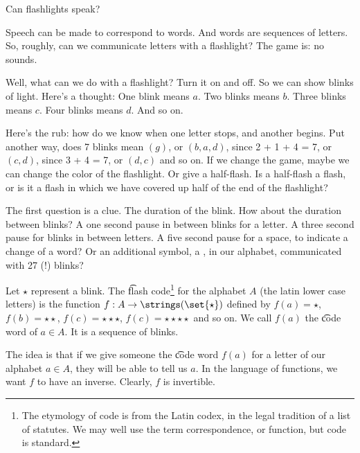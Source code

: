 

Can flashlights speak?

Speech can be made to correspond to words.
And words are sequences of letters.
So, roughly, can we communicate letters with a flashlight?
The game is: no sounds.


Well, what can we do with a flashlight?
Turn it on and off.
So we can show blinks of light.
Here's a thought:
One blink means $a$.
Two blinks means $b$.
Three blinks means $c$.
Four blinks means $d$.
And so on.

Here's the rub: how do we know when one letter stops, and another begins.
Put another way, does 7 blinks mean $(g)$, or $(b, a, d)$, since 2 + 1 + 4 = 7, or $(c, d)$, since 3 + 4 = 7, or $(d, c)$ and so on.
If we change the game, maybe we can change the color of the flashlight.
Or give a half-flash.
Is a half-flash a  flash, or is it a flash in which we have covered up half of the end of the flashlight?

The first question is a clue.
The duration of the blink.
How about the duration between blinks?
A one second pause in between blinks for a letter.
A three second pause for blinks in between letters.
A five second pause for a space, to indicate a change of a word?
Or an additional symbol, a , in our alphabet, communicated with 27 (!) blinks?



\newcommand{\blink}{\star}
\newcommand{\pause}{\square}
Let $\blink$ represent a blink.
The \t{flash code}\footnote{The etymology of code is from the Latin codex, in the legal tradition of a list of statutes. We may well use the term correspondence, or function, but code is standard.} for the alphabet $A$ (the latin lower case letters) is the function $f: A \to \strings(\set{\blink})$ defined by $f(a) = \blink$, $f(b) = \blink\blink$, $f(c) = \blink\blink\blink$, $f(c) = \blink\blink\blink\blink$ and so on.
We call $f(a)$ the \t{code word} of $a \in A$.
It is a sequence of blinks.

The idea is that if we give someone the \t{code word} $f(a)$ for a letter of our alphabet $a \in A$, they will be able to tell us $a$.
In the language of functions, we want $f$ to have an inverse.
Clearly, $f$ is invertible.

